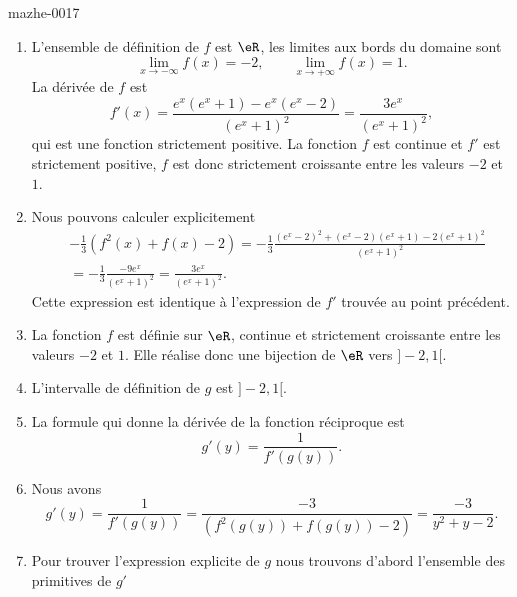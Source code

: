 
\begin{corrige}{mazhe-0017}

\begin{enumerate}
\item L'ensemble de définition de $f$ est $\eR$, les limites aux bords du domaine sont 
  \begin{equation*}
    \lim_{x\to -\infty} f(x) = -2 , \qquad \lim_{x\to +\infty} f(x) = 1.
  \end{equation*}
La d\'eriv\'ee de $f$ est 
\begin{equation*}
  f'(x) = \frac{e^x(e^x+1)-e^x(e^x-2)}{(e^x+1)^2} =  \frac{3e^x}{(e^x+1)^2},
\end{equation*}
qui est une fonction strictement positive. La fonction $f$ est continue et $f'$ est strictement positive, $f$ est donc strictement croissante entre les valeurs $-2$ et $1$. 
\item Nous pouvons calculer explicitement 
  \begin{align*} 
 &    -\frac{1}{3}\left(f^2(x) + f(x)-2\right) = -\frac{1}{3} \frac{(e^x-2)^2 + (e^x-2)(e^x+1)-2(e^x+1)^2}{(e^x+1)^2} \\
&= -\frac{1}{3}\frac{-9e^x}{(e^x+1)^2} = \frac{3e^x}{(e^x+1)^2}.
  \end{align*}
Cette expression est identique \`a l'expression de $f'$ trouvée au point pr\'ec\'edent. 
\item La fonction $f$ est d\'efinie sur $\eR$, continue et  strictement croissante entre les valeurs $-2$ et $1$. Elle réalise donc une bijection de $\eR$ vers $]-2,1[$. 
\item L'intervalle de définition de $g$ est $]-2,1[$. 
\item La formule qui donne la dérivée de la fonction réciproque est 
  \begin{equation*}
    g'(y) = \frac{1}{f'(g(y))}.
  \end{equation*}
\item  Nous avons 
  \begin{equation*}
    g'(y) = \frac{1}{f'(g(y))} =\frac{-3}{\left(f^2(g(y)) + f(g(y))-2\right)} = \frac{-3}{y^2 +y-2}.
  \end{equation*}
\item Pour trouver l'expression explicite de $g$ nous trouvons d'abord l'ensemble des primitives de $g'$
 \begin{equation*}

\end{equation*}
\end{enumerate}
\end{corrige}
